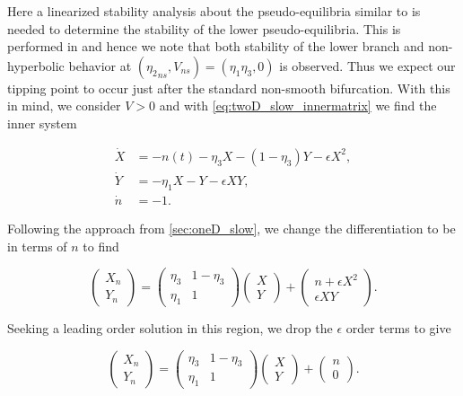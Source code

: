 Here a linearized stability analysis about the pseudo-equilibria similar to \cite{seydel2009practical} is needed to determine the stability of the lower pseudo-equilibria. This is performed in \cite{dijkstra2013nonlinear} and hence we note that both stability of the lower branch and non-hyperbolic behavior at $({\eta_2}_{ns},V_{ns})=(\eta_1\eta_3,0)$ is observed. Thus we expect our tipping point to occur just after the standard non-smooth bifurcation. With this in mind, we consider $V>0$ and with \eqref{eq:twoD_slow_innermatrix} we find the inner system

\begin{equation}\label{eq:twoD_slow_positiveinner}
 \begin{aligned}
  \dot{X} & = -n(t)-\eta_3 X-(1-\eta_3)Y-\epsilon X^2, \\
  \dot{Y} & = -\eta_1 X-Y-\epsilon XY, \\
 \dot{n} & = -1.
 \end{aligned}
\end{equation}

Following the approach from \autoref{sec:oneD_slow}, we change the differentiation to be in terms of $n$ to find

\begin{equation*}
\begin{pmatrix}
X_n\\
Y_n
\end{pmatrix}=
\begin{pmatrix}
\eta_3 & 1-\eta_3 \\ 
\eta_1 & 1
\end{pmatrix}
\begin{pmatrix}
X\\
Y
\end{pmatrix} +
\begin{pmatrix}
n+\epsilon X^2\\
\epsilon XY
\end{pmatrix}.
\end{equation*}

Seeking a leading order solution in this region, we drop the $\epsilon$ order terms to give 

\begin{equation}\label{eq:twoD_slow_uppermatrix}
\begin{pmatrix}
X_n\\
Y_n
\end{pmatrix}=
\begin{pmatrix}
\eta_3 & 1-\eta_3 \\ 
\eta_1 & 1
\end{pmatrix}
\begin{pmatrix}
X\\
Y
\end{pmatrix} +
\begin{pmatrix}
n\\
0
\end{pmatrix}.
\end{equation}

